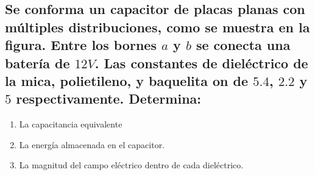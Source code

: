 \documentclass[10pt, twoside]{article}
\begin{document}
\subsection*{Se conforma un capacitor de placas planas con múltiples
	distribuciones, como se muestra en la figura.
	Entre los bornes $a$ y $b$ se conecta una batería de $12V$.
	Las constantes de dieléctrico de la mica, polietileno, y baquelita on de $5.4$,
	$2.2$ y $5$ respectivamente. Determina:
	}
\begin{enumerate}
	\item La capacitancia equivalente
	\item La energía almacenada en el capacitor.
	\item La magnitud del campo eléctrico dentro de cada dieléctrico.
\end{enumerate}
\begin{figure}[H]
	\centering
	
\end{figure}
\end{document}
